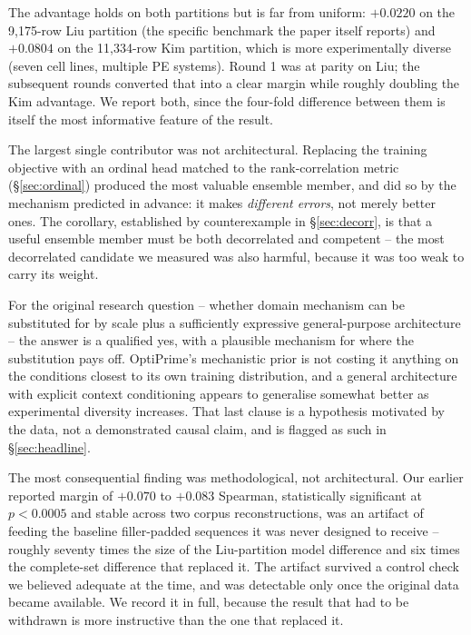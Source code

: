 \documentclass[11pt]{article}
\begin{document}
The advantage holds on both partitions but is far from uniform: $+0.0220$ on the
9{,}175-row Liu partition (the specific benchmark the paper itself reports) and
$+0.0804$ on the 11{,}334-row Kim partition, which is more experimentally diverse
(seven cell lines, multiple PE systems). Round 1 was at parity on Liu; the
subsequent rounds converted that into a clear margin while roughly doubling the
Kim advantage. We report both, since the four-fold difference between them is
itself the most informative feature of the result.

The largest single contributor was not architectural. Replacing the training
objective with an ordinal head matched to the rank-correlation metric
(\S\ref{sec:ordinal}) produced the most valuable ensemble member, and did so by
the mechanism predicted in advance: it makes \emph{different errors}, not merely
better ones. The corollary, established by counterexample in \S\ref{sec:decorr},
is that a useful ensemble member must be both decorrelated and competent --
the most decorrelated candidate we measured was also harmful, because it was too
weak to carry its weight.

For the original research question -- whether domain mechanism can be substituted
for by scale plus a sufficiently expressive general-purpose architecture -- the
answer is a qualified yes, with a plausible mechanism for where the substitution
pays off. OptiPrime's mechanistic prior is not costing it anything on the
conditions closest to its own training distribution, and a general architecture
with explicit context conditioning appears to generalise somewhat better as
experimental diversity increases. That last clause is a hypothesis motivated by
the data, not a demonstrated causal claim, and is flagged as such in
\S\ref{sec:headline}.

The most consequential finding was methodological, not architectural. Our earlier
reported margin of $+0.070$ to $+0.083$ Spearman, statistically significant at
$p<0.0005$ and stable across two corpus reconstructions, was an artifact of
feeding the baseline filler-padded sequences it was never designed to receive --
roughly seventy times the size of the Liu-partition model difference and six times
the complete-set difference that replaced it. The artifact survived a control
check we believed adequate at the time, and was detectable only once the original
data became available. We record it in full, because the result that had to be
withdrawn is more instructive than the one that replaced it.
\end{document}
